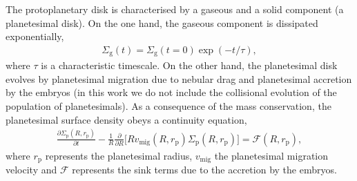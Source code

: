 \documentclass{aa}
\begin{document}
The protoplanetary disk is characterised by a gaseous and a solid component (a planetesimal disk). On the one hand, the gaseous component is dissipated
exponentially,
\begin{eqnarray}
\Sigma_{\text{g}}(t)= \Sigma_{\text{g}}(t=0)\exp(-t/\tau),
\label{eq:evol_Sg}
\end{eqnarray}
where $\tau$ is a characteristic timescale. On the other hand, the planetesimal disk evolves by planetesimal migration due to nebular
drag and planetesimal accretion by the embryos (in this work we do not include the collisional evolution of the population of
planetesimals). As a consequence of the mass conservation, the planetesimal surface density obeys a continuity equation,
\begin{eqnarray}
\frac{\partial \Sigma_{\text{p}}(R,r_{\text{p}})}{\partial t} - \frac{1}{R} \frac{\partial}{\partial R} \Big[ Rv_{\text{mig}}(R,r_{\text{p}})
\Sigma_{\text{p}}(R,r_{\text{p}}) \Big] = \mathcal{F}(R,r_{\text{p}}),
\label{eq:evol_Sp}
\end{eqnarray}
where $r_{\text{p}}$ represents the planetesimal radius, $v_{\text{mig}}$ the planetesimal migration velocity and $\mathcal{F}$ represents the
sink terms due to the accretion by the embryos.
\end{document}
